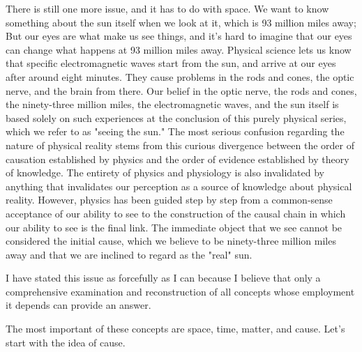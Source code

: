 \documentclass[a4paper,12pt]{book}[2004/02/16]
\theoremstyle{ilemma}
\theoremstyle{itheorem}
\theoremstyle{iother}
\theoremstyle{icorollary}
\theoremstyle{numcorollary}
\theoremstyle{idefinition}
\begin{document}
There is still one more issue, and it has to do with space. We want to know something about the sun itself when we look at it, which is 93 million miles away; But our eyes are what make us see things, and it's hard to imagine that our eyes can change what happens at 93 million miles away. Physical science
lets us know that specific electromagnetic waves start from the sun, and
arrive at our eyes after around eight minutes. They cause problems in the rods and cones, the optic nerve, and the brain from there. Our belief in the optic nerve, the rods and cones, the ninety-three million miles, the electromagnetic waves, and the sun itself is based solely on such experiences at the conclusion of this purely physical series, which we refer to as "seeing the sun." The most serious confusion regarding the nature of physical reality stems from this curious divergence between the order of causation established by physics and the order of evidence established by theory of knowledge. The entirety of physics and physiology is also invalidated by anything that invalidates our perception as a source of knowledge about physical reality. However, physics has been guided step by step from a common-sense acceptance of our ability to see to the construction of the causal chain in which our ability to see is the final link. The immediate object that we see cannot be considered the initial cause, which we believe to be ninety-three million miles away and that we are inclined to regard as the "real" sun.

I have stated this issue as forcefully as I can because I believe that only a comprehensive examination and reconstruction of all concepts whose employment it depends can provide an answer.

The most important of these concepts are space, time, matter, and cause. Let's start with the idea of cause.
\end{document}
